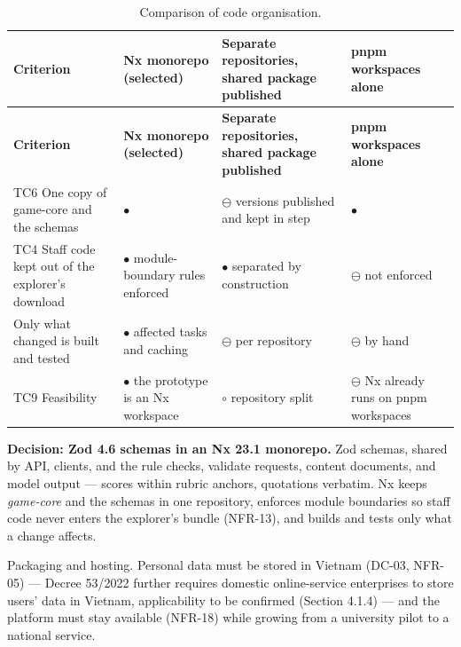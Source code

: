 {\small
\begin{longtable}{|>{\raggedright\arraybackslash}p{}|>{\raggedright\arraybackslash}p{}|>{\raggedright\arraybackslash}p{}|>{\raggedright\arraybackslash}p{}|}
\caption{Comparison of code organisation.} \\
\hline
\textbf{Criterion} & \textbf{Nx monorepo (selected)} & \textbf{Separate repositories, shared package published} & \textbf{pnpm workspaces alone} \\ \hline
\endfirsthead
\hline
\textbf{Criterion} & \textbf{Nx monorepo (selected)} & \textbf{Separate repositories, shared package published} & \textbf{pnpm workspaces alone} \\ \hline
\endhead
TC6 One copy of game-core and the schemas & $\bullet$ & $\ominus$ versions published and kept in step & $\bullet$ \\ \hline
TC4 Staff code kept out of the explorer's download & $\bullet$ module-boundary rules enforced\cite{r158} & $\bullet$ separated by construction & $\ominus$ not enforced \\ \hline
Only what changed is built and tested & $\bullet$ affected tasks and caching\cite{r158} & $\ominus$ per repository & $\ominus$ by hand \\ \hline
TC9 Feasibility & $\bullet$ the prototype is an Nx workspace & $\circ$ repository split & $\ominus$ Nx already runs on pnpm workspaces \\ \hline
\end{longtable}
}

\textbf{Decision: Zod 4.6 schemas in an Nx 23.1 monorepo.} Zod schemas, shared by API, clients, and the rule checks, validate requests, content documents, and model output --- scores within rubric anchors, quotations verbatim. Nx keeps \textit{game-core} and the schemas in one repository, enforces module boundaries so staff code never enters the explorer's bundle (NFR-13), and builds and tests only what a change affects\cite{r158}.

Packaging and hosting. Personal data must be stored in Vietnam (DC-03, NFR-05) --- Decree 53/2022 further requires domestic online-service enterprises to store users' data in Vietnam, applicability to be confirmed (Section 4.1.4)\cite{r159,r160} --- and the platform must stay available (NFR-18) while growing from a university pilot to a national service.

